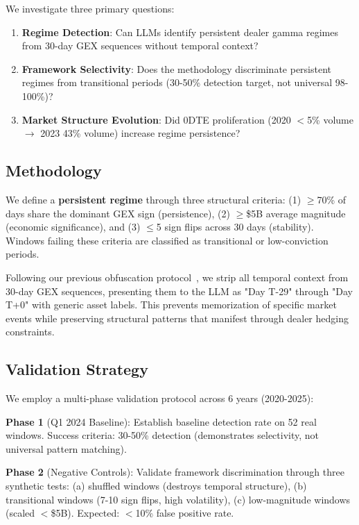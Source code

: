 We investigate three primary questions:

\begin{enumerate}
\item \textbf{Regime Detection}: Can LLMs identify persistent dealer gamma regimes from 30-day GEX sequences without temporal context?
\item \textbf{Framework Selectivity}: Does the methodology discriminate persistent regimes from transitional periods (30-50\% detection target, not universal 98-100\%)?
\item \textbf{Market Structure Evolution}: Did 0DTE proliferation (2020 $<$5\% volume $\rightarrow$ 2023 43\% volume) increase regime persistence?
\end{enumerate}

\subsection{Methodology}

We define a \textbf{persistent regime} through three structural criteria: (1) $\geq$70\% of days share the dominant GEX sign (persistence), (2) $\geq$\$5B average magnitude (economic significance), and (3) $\leq$5 sign flips across 30 days (stability). Windows failing these criteria are classified as transitional or low-conviction periods.

Following our previous obfuscation protocol~\citep{regan2025obfuscation}, we strip all temporal context from 30-day GEX sequences, presenting them to the LLM as "Day T-29" through "Day T+0" with generic asset labels. This prevents memorization of specific market events while preserving structural patterns that manifest through dealer hedging constraints.

\subsection{Validation Strategy}

We employ a multi-phase validation protocol across 6 years (2020-2025):

\textbf{Phase 1} (Q1 2024 Baseline): Establish baseline detection rate on 52 real windows. Success criteria: 30-50\% detection (demonstrates selectivity, not universal pattern matching).

\textbf{Phase 2} (Negative Controls): Validate framework discrimination through three synthetic tests: (a) shuffled windows (destroys temporal structure), (b) transitional windows (7-10 sign flips, high volatility), (c) low-magnitude windows (scaled $<$\$5B). Expected: $<$10\% false positive rate.

